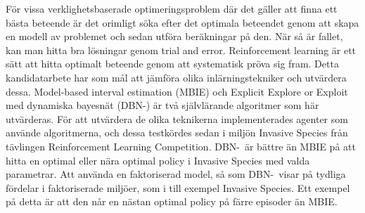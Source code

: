 För vissa verklighetsbaserade optimeringsproblem där det gäller att finna ett bästa beteende är det orimligt söka efter det optimala beteendet genom att skapa en modell av problemet och sedan utföra beräkningar på den. När så är fallet, kan man hitta bra lösningar genom trial and error. Reinforcement learning är ett sätt att hitta optimalt beteende genom att systematisk pröva sig fram.
Detta kandidatarbete har som mål att jämföra olika inlärningstekniker och utvärdera dessa.
Model-based interval estimation (MBIE) och Explicit Explore or Exploit med dynamiska bayesnät (DBN-\etre) är 
två självlärande algoritmer som här utvärderas.
För att utvärdera de olika teknikerna implementerades agenter som använde algoritmerna, och dessa testkördes sedan 
i miljön Invasive Species från tävlingen Reinforcement Learning Competition.
DBN-\etre\ är bättre än MBIE på att hitta en optimal eller nära optimal policy i Invasive Species med valda parametrar.
Att använda en faktoriserad model, så som DBN-\etre\, visar på tydliga fördelar i faktoriserade miljöer, som i till exempel Invasive Species. 
Ett exempel på detta är att den når en nästan optimal policy på färre episoder än MBIE.





